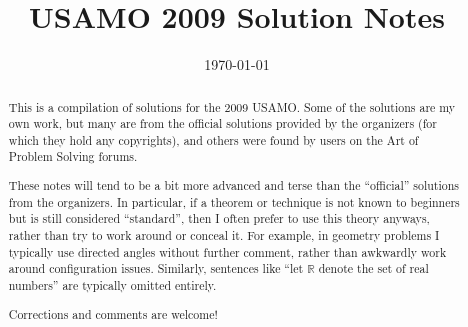 \documentclass[11pt]{scrartcl}
\title{USAMO 2009 Solution Notes}
\date{\today}
\begin{document}
\maketitle

\begin{abstract}
This is a compilation of solutions
for the 2009 USAMO.
Some of the solutions are my own work,
but many are from the official solutions provided by the organizers
(for which they hold any copyrights),
and others were found by users on the Art of Problem Solving forums.

These notes will tend to be a bit more advanced and terse than the ``official''
solutions from the organizers.
In particular, if a theorem or technique is not known to beginners
but is still considered ``standard'', then I often prefer to
use this theory anyways, rather than try to work around or conceal it.
For example, in geometry problems I typically use directed angles
without further comment, rather than awkwardly work around configuration issues.
Similarly, sentences like ``let $\mathbb{R}$ denote the set of real numbers''
are typically omitted entirely.

Corrections and comments are welcome!
\end{abstract}

\tableofcontents
\newpage

\addtocounter{section}{-1}
\end{document}
